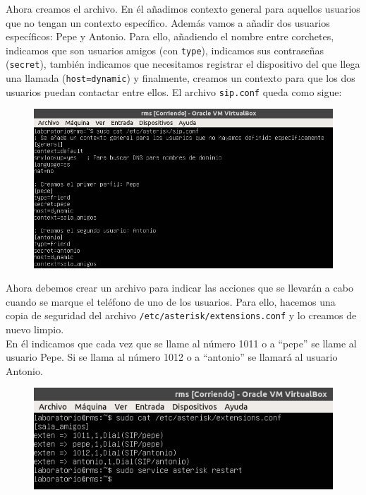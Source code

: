\documentclass[11pt,a4paper]{article}
\begin{document}
Ahora creamos el archivo. En él añadimos contexto general para aquellos usuarios que no tengan un contexto específico. Además vamos a añadir dos usuarios específicos: Pepe y Antonio. Para ello, añadiendo el nombre entre corchetes, indicamos que son usuarios amigos (con \texttt{type}), indicamos sus contraseñas (\texttt{secret}), también indicamos que necesitamos registrar el dispositivo del que llega una llamada (\texttt{host=dynamic}) y finalmente, creamos un contexto para que los dos usuarios puedan contactar entre ellos. El archivo \texttt{sip.conf} queda como sigue:

\begin{figure}[H]
	\centering
	\includegraphics[scale=0.58]{img/4.png}
\end{figure}

Ahora debemos crear un archivo para indicar las acciones que se llevarán a cabo cuando se marque el teléfono de uno de los usuarios. Para ello, hacemos una copia de seguridad del archivo \texttt{/etc/asterisk/extensions.conf} y lo creamos de nuevo limpio.\\

En él indicamos que cada vez que se llame al número 1011 o a ``pepe'' se llame al usuario Pepe. Si se llama al número 1012 o a ``antonio'' se llamará al usuario Antonio.

\begin{figure}[H]
	\centering
	\includegraphics[scale=0.76]{img/6.png}
\end{figure}
\end{document}
